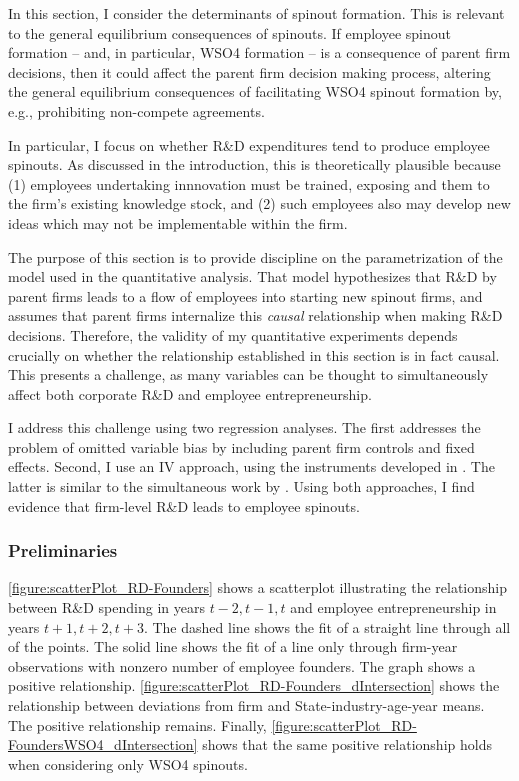 \documentclass[12pt,english]{article}
\theoremstyle{remark}
\begin{document}
In this section, I consider the determinants of spinout formation. This is relevant to the general equilibrium consequences of spinouts. If employee spinout formation -- and, in particular, WSO4 formation -- is a consequence of parent firm decisions, then it could affect the parent firm decision making process, altering the general equilibrium consequences of facilitating WSO4 spinout formation by, e.g., prohibiting non-compete agreements. 

In particular, I focus on whether R\&D expenditures tend to produce employee spinouts. As discussed in the introduction, this is theoretically plausible because (1) employees undertaking innnovation must be trained, exposing and them to the firm's existing knowledge stock, and (2) such employees also may develop new ideas which may not be implementable within the firm.  

The purpose of this section is to provide discipline on the parametrization of the model used in the quantitative analysis. That model hypothesizes that R\&D by parent firms leads to a flow of employees into starting new spinout firms, and assumes that parent firms internalize this \textit{causal} relationship when making R\&D decisions. Therefore, the validity of my quantitative experiments depends crucially on whether the relationship established in this section is in fact causal. This presents a challenge, as many variables can be thought to simultaneously affect both corporate R\&D and employee entrepreneurship.

I address this challenge using two regression analyses. The first addresses the problem of omitted variable bias by including parent firm controls and fixed effects. Second, I use an IV approach, using the instruments developed in \cite{bloom_identifying_2013}. The latter is similar to the simultaneous work by \cite{babina_entrepreneurial_2018}. Using both approaches, I find evidence that firm-level R\&D leads to employee spinouts. 

\subsubsection{Preliminaries}

\autoref{figure:scatterPlot_RD-Founders} shows a scatterplot illustrating the relationship between R\&D spending in years $t-2,t-1,t$ and employee entrepreneurship in years $t+1,t+2,t+3$. The dashed line shows the fit of a straight line through all of the points. The solid line shows the fit of a line only through firm-year observations with nonzero number of employee founders. The graph shows a positive relationship. \autoref{figure:scatterPlot_RD-Founders_dIntersection} shows the relationship between deviations from firm and State-industry-age-year means. The positive relationship remains. Finally, \autoref{figure:scatterPlot_RD-FoundersWSO4_dIntersection} shows that the same positive relationship holds when considering only WSO4 spinouts. 
\end{document}
